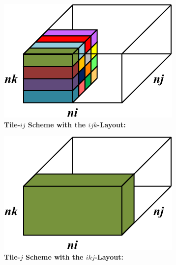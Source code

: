 \documentclass{sig-alternate-05-2015}
\begin{document}
\begin{figure}[!bt]
  \centering
  \label{fig:implementation:tiling:ijk_layout_tile_j}
  \caption{
    \textbf{Tile-\(ij\) Scheme with the \(ijk\)-Layout:} 
  }
  \includegraphics[width=0.95\columnwidth]{figures/ijk_layout_tile_ij_scheme.pdf}
\end{figure}

\begin{figure}[!bt]
  \centering
  \label{fig:implementation:tiling:ikj_layout_tile_j}
  \caption{
    \textbf{Tile-\(j\) Scheme with the \(ikj\)-Layout:} 
  }
  \includegraphics[width=0.95\columnwidth]{figures/ikj_layout_tile_j_scheme.pdf}
\end{figure}
\end{document}
